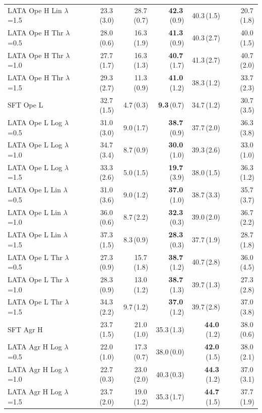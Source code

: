 \begin{longtable}{lrrrrr}
LATA Ope H Lin $\lambda$=1.5 & 23.3\,(3.0) & 28.7\,(0.7) & \textbf{42.3}\,(0.9) & 40.3\,(1.5) & 20.7\,(1.8) \\
LATA Ope H Thr $\lambda$=0.5 & 28.0\,(0.6) & 16.3\,(1.9) & \textbf{41.3}\,(0.9) & 40.3\,(2.7) & 40.0\,(1.5) \\
LATA Ope H Thr $\lambda$=1.0 & 27.7\,(1.7) & 16.3\,(1.3) & \textbf{40.7}\,(1.7) & 41.3\,(2.7) & 40.7\,(2.0) \\
LATA Ope H Thr $\lambda$=1.5 & 29.3\,(2.7) & 11.3\,(0.9) & \textbf{41.0}\,(1.2) & 38.3\,(1.2) & 33.7\,(2.3) \\
SFT Ope L & 32.7\,(1.5) & 4.7\,(0.3) & \textbf{9.3}\,(0.7) & 34.7\,(1.2) & 30.7\,(3.5) \\
LATA Ope L Log $\lambda$=0.5 & 31.0\,(3.0) & 9.0\,(1.7) & \textbf{38.7}\,(0.9) & 37.7\,(2.0) & 36.3\,(3.8) \\
LATA Ope L Log $\lambda$=1.0 & 34.7\,(3.4) & 8.7\,(0.9) & \textbf{30.0}\,(1.0) & 39.3\,(2.6) & 33.0\,(1.0) \\
LATA Ope L Log $\lambda$=1.5 & 33.3\,(2.6) & 5.0\,(1.5) & \textbf{19.7}\,(3.9) & 38.0\,(1.5) & 36.3\,(1.2) \\
LATA Ope L Lin $\lambda$=0.5 & 31.0\,(3.6) & 9.0\,(1.2) & \textbf{37.0}\,(1.0) & 38.7\,(3.3) & 35.7\,(3.7) \\
LATA Ope L Lin $\lambda$=1.0 & 36.0\,(0.6) & 8.7\,(2.2) & \textbf{32.3}\,(0.3) & 39.0\,(2.0) & 36.7\,(2.2) \\
LATA Ope L Lin $\lambda$=1.5 & 37.3\,(1.5) & 8.3\,(0.9) & \textbf{28.3}\,(0.3) & 37.7\,(1.9) & 28.7\,(1.8) \\
LATA Ope L Thr $\lambda$=0.5 & 27.3\,(0.9) & 15.7\,(1.8) & \textbf{38.7}\,(1.2) & 40.7\,(2.8) & 36.0\,(4.5) \\
LATA Ope L Thr $\lambda$=1.0 & 28.3\,(0.9) & 13.0\,(1.2) & \textbf{38.7}\,(1.3) & 39.7\,(1.3) & 27.3\,(2.8) \\
LATA Ope L Thr $\lambda$=1.5 & 34.3\,(2.2) & 9.7\,(1.2) & \textbf{37.0}\,(1.2) & 39.7\,(2.8) & 37.0\,(3.8) \\
SFT Agr H & 23.7\,(1.5) & 21.0\,(1.0) & 35.3\,(1.3) & \textbf{44.0}\,(1.2) & 38.0\,(0.6) \\
LATA Agr H Log $\lambda$=0.5 & 22.0\,(1.0) & 17.3\,(0.7) & 38.0\,(0.0) & \textbf{42.0}\,(1.5) & 38.0\,(2.1) \\
LATA Agr H Log $\lambda$=1.0 & 22.7\,(0.3) & 23.0\,(2.0) & 40.3\,(0.3) & \textbf{44.3}\,(1.2) & 37.0\,(3.1) \\
LATA Agr H Log $\lambda$=1.5 & 23.7\,(2.0) & 19.0\,(1.2) & 35.3\,(1.7) & \textbf{44.7}\,(1.5) & 37.7\,(1.9) \\

\end{longtable}
